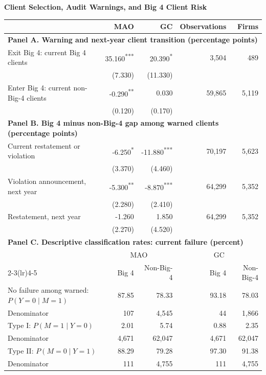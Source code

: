 \documentclass{article}
\newcommand{\sym}[1]{\textsuperscript{#1}}
\begin{document}
\begin{minipage}{19cm}
\centering
\textbf{Client Selection, Audit Warnings, and Big 4 Client Risk}\par\medskip
\small\renewcommand{\arraystretch}{1.12}\setlength{\tabcolsep}{5pt}
\begin{tabular*}{\linewidth}{@{\extracolsep{\fill}}lrrrr@{}}
\toprule
 & MAO & GC & Observations & Firms \\
\midrule
\multicolumn{5}{l}{\textbf{Panel A. Warning and next-year client transition (percentage points)}} \\
Exit Big 4: current Big 4 clients & 35.160\sym{***} & 20.390\sym{*} & 3,504 & 489 \\
 & (7.330) & (11.330) & & \\
Enter Big 4: current non-Big-4 clients & -0.290\sym{**} & 0.030 & 59,865 & 5,119 \\
 & (0.120) & (0.170) & & \\
\midrule
\multicolumn{5}{l}{\textbf{Panel B. Big 4 minus non-Big-4 gap among warned clients (percentage points)}} \\
Current restatement or violation & -6.250\sym{*} & -11.880\sym{***} & 70,197 & 5,623 \\
 & (3.370) & (4.460) & & \\
Violation announcement, next year & -5.300\sym{**} & -8.870\sym{***} & 64,299 & 5,352 \\
 & (2.280) & (2.410) & & \\
Restatement, next year & -1.260 & 1.850 & 64,299 & 5,352 \\
 & (2.270) & (4.520) & & \\
\midrule
\multicolumn{5}{l}{\textbf{Panel C. Descriptive classification rates: current failure (percent)}} \\
 & \multicolumn{2}{c}{MAO} & \multicolumn{2}{c}{GC} \\
\cmidrule(lr){2-3}\cmidrule(lr){4-5}
 & Big 4 & Non-Big-4 & Big 4 & Non-Big-4 \\
No failure among warned: $P(Y=0\mid M=1)$ & 87.85 & 78.33 & 93.18 & 78.03 \\
Denominator & 107 & 4,545 & 44 & 1,866 \\
Type I: $P(M=1\mid Y=0)$ & 2.01 & 5.74 & 0.88 & 2.35 \\
Denominator & 4,671 & 62,047 & 4,671 & 62,047 \\
Type II: $P(M=0\mid Y=1)$ & 88.29 & 79.28 & 97.30 & 91.38 \\
Denominator & 111 & 4,755 & 111 & 4,755 \\

\end{tabular*}
\end{minipage}
\end{document}
